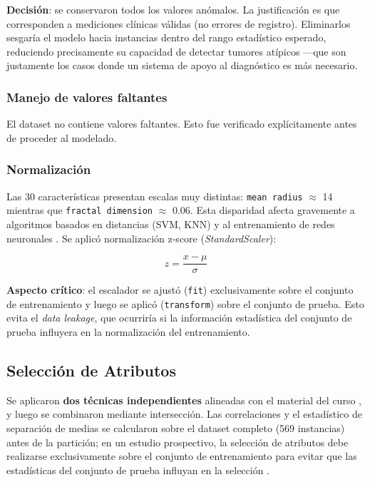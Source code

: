 \documentclass[journal]{IEEEtran}
\begin{document}
\textbf{Decisión}: se conservaron todos los valores anómalos. La justificación es que corresponden a mediciones clínicas válidas (no errores de registro). Eliminarlos sesgaría el modelo hacia instancias dentro del rango estadístico esperado, reduciendo precisamente su capacidad de detectar tumores atípicos —que son justamente los casos donde un sistema de apoyo al diagnóstico es más necesario.

\subsubsection{Manejo de valores faltantes}
El dataset no contiene valores faltantes. Esto fue verificado explícitamente antes de proceder al modelado.

\subsubsection{Normalización}
Las 30 características presentan escalas muy distintas: \texttt{mean radius} $\approx$ 14 mientras que \texttt{fractal dimension} $\approx$ 0.06. Esta disparidad afecta gravemente a algoritmos basados en distancias (SVM, KNN) y al entrenamiento de redes neuronales \cite{kantardzic}. Se aplicó normalización z-score (\textit{StandardScaler}):

\begin{equation}
  z = \frac{x - \mu}{\sigma}
\end{equation}

\textbf{Aspecto crítico}: el escalador se ajustó (\texttt{fit}) exclusivamente sobre el conjunto de entrenamiento y luego se aplicó (\texttt{transform}) sobre el conjunto de prueba. Esto evita el \textit{data leakage}, que ocurriría si la información estadística del conjunto de prueba influyera en la normalización del entrenamiento.

\subsection{Selección de Atributos}

Se aplicaron \textbf{dos técnicas independientes} alineadas con el material del curso \cite{feature_sel}, y luego se combinaron mediante intersección. Las correlaciones y el estadístico de separación de medias se calcularon sobre el dataset completo (569 instancias) antes de la partición; en un estudio prospectivo, la selección de atributos debe realizarse exclusivamente sobre el conjunto de entrenamiento para evitar que las estadísticas del conjunto de prueba influyan en la selección \cite{garcia2015}.
\end{document}
